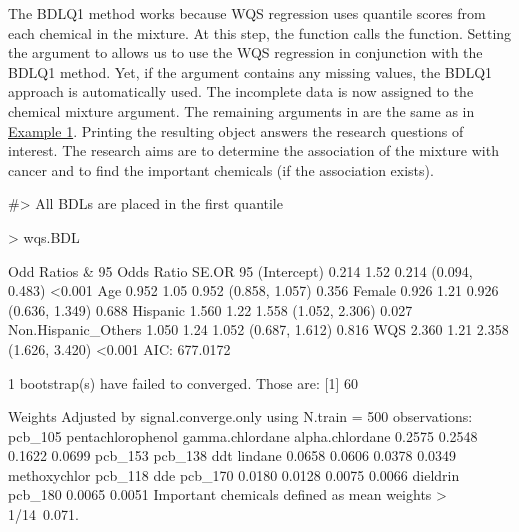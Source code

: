 The BDLQ1 method works because WQS regression uses quantile scores from
each chemical in the mixture. At this step, the 
function calls the  function. Setting the
argument  to  allows us to use the WQS
regression in conjunction with the BDLQ1 method. Yet, if the 
argument contains any missing values, the BDLQ1 approach is
automatically used. The incomplete data  is now assigned to
the chemical mixture  argument. The remaining arguments in
 are the same as in
\protect\hyperlink{Example-1}{Example 1}. Printing the resulting object
answers the research questions of interest. The research aims are to
determine the association of the mixture with cancer and to find the
important chemicals (if the association exists).

\begin{Schunk}
\begin{Soutput}
#> All BDLs are placed in the first quantile
\end{Soutput}
\begin{Sinput}
> wqs.BDL
\end{Sinput}
\begin{Soutput}

Odd Ratios & 95%
                     Odds Ratio  SE.OR                95%
(Intercept)               0.214   1.52  0.214 (0.094, 0.483)   <0.001
Age                       0.952   1.05  0.952 (0.858, 1.057)    0.356
Female                    0.926   1.21  0.926 (0.636, 1.349)    0.688
Hispanic                  1.560   1.22  1.558 (1.052, 2.306)    0.027
Non.Hispanic_Others       1.050   1.24  1.052 (0.687, 1.612)    0.816
WQS                       2.360   1.21  2.358 (1.626, 3.420)   <0.001
AIC:  677.0172 

1 bootstrap(s) have failed to converged. Those are: 
[1] 60

 Weights Adjusted by signal.converge.only using N.train = 500 observations: 
          pcb_105  pentachlorophenol    gamma.chlordane    alpha.chlordane  
           0.2575             0.2548             0.1622             0.0699  
          pcb_153            pcb_138                ddt            lindane  
           0.0658             0.0606             0.0378             0.0349  
     methoxychlor            pcb_118                dde            pcb_170  
           0.0180             0.0128             0.0075             0.0066  
         dieldrin            pcb_180  
           0.0065             0.0051  
Important chemicals defined as mean weights > 1/14~0.071. 
\end{Soutput}
\end{Schunk}

